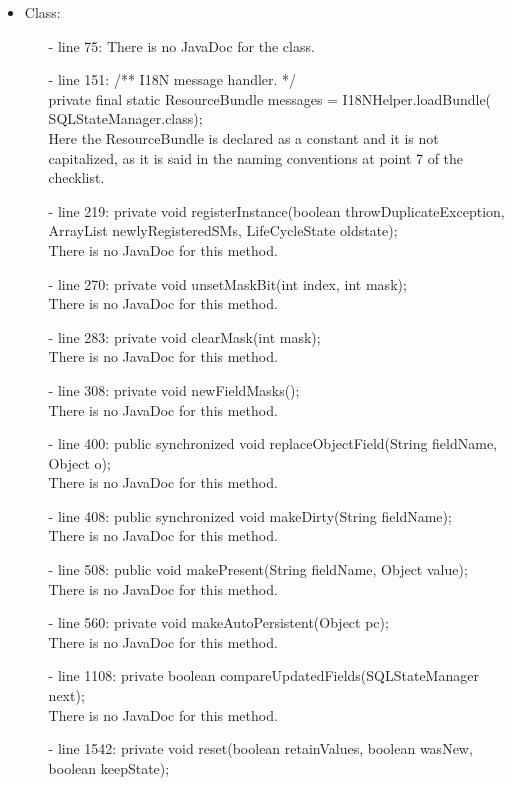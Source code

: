 \documentclass[18pt,oneside,a4paper, titlepage]{article}
\begin{document}
	\begin{itemize}
		\item Class:
			\begin{itemize}
				\item[-] line 75: There is no JavaDoc for the class.
				\item[-] line 151: /** I18N message handler. */\\
				private final static ResourceBundle messages = I18NHelper.loadBundle(
				SQLStateManager.class);\\
				Here the ResourceBundle is declared as a constant and it is not capitalized, as it is said in the naming conventions at point 7 of the checklist.
				\item[-] line 219: private void registerInstance(boolean throwDuplicateException,
				ArrayList newlyRegisteredSMs, LifeCycleState oldstate);\\
				There is no JavaDoc for this method.
				\item[-] line 270: private void unsetMaskBit(int index, int mask);\\
				There is no JavaDoc for this method.
				\item[-] line 283: private void clearMask(int mask);\\
				There is no JavaDoc for this method.
				\item[-] line 308: private void newFieldMasks();\\
				There is no JavaDoc for this method.
				\item[-] line 400: public synchronized void replaceObjectField(String fieldName, Object o);\\
				There is no JavaDoc for this method.
				\item[-] line 408: public synchronized void makeDirty(String fieldName);
				\\There is no JavaDoc for this method.
				\item[-] line 508: public void makePresent(String fieldName, Object value);
				\\There is no JavaDoc for this method.
				\item[-] line 560: private void makeAutoPersistent(Object pc);
				\\There is no JavaDoc for this method.
				\item[-] line 1108: private boolean compareUpdatedFields(SQLStateManager next);
				\\There is no JavaDoc for this method.
				\item[-] line 1542: private void reset(boolean retainValues, boolean wasNew, boolean keepState);

\end{itemize}
\end{itemize}
\end{document}
